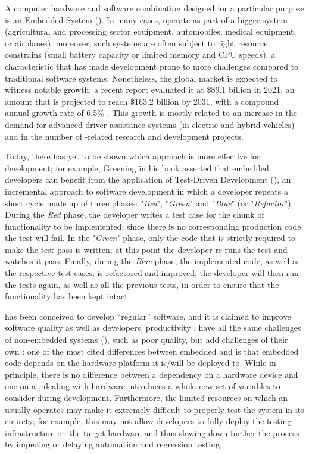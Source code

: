 \label{chap:1_introduction}
A computer hardware and software combination designed for a particular purpose is an Embedded System (\es). In many cases, \ess operate as part of a bigger system (\eg  agricultural and processing sector equipment, automobiles, medical equipment, or airplanes); moreover, such systems are often subject to tight resource constrains (\eg small battery capacity or limited memory and CPU speeds), a characteristic that has made \es development prone to more challenges compared to traditional software systems.
Nonetheless, the global \ess market is expected to witness notable growth: a recent report evaluated it at $\$$89.1 billion in 2021, an amount that is projected to reach $\$$163.2 billion by 2031, with a compound annual growth rate of 6.5\% \cite{ESSTR2022}. This growth is mostly related to an increase in the demand for advanced driver-assistance systems (in electric and hybrid vehicles) and in the number of \ess-related research and development projects.  

Today, there has yet to be shown which approach is more effective for \ess development; for example, Greening \cite{TDDEC} in his book asserted that embedded developers can benefit from the application of Test-Driven Development (\tdd), an incremental approach to software development in which a developer repeats a short cycle made up of three phases: "\textit{Red}", "\textit{Green}" and "\textit{Blue}" (or "\textit{Refactor}") \cite{TDDByExample}. 
During the \textit{Red} phase, the developer writes a test case for the chunk of functionality to be implemented; since there is no corresponding production code, the test will fail. 
In the "\textit{Green}" phase, only the code that is strictly required to make the test pass is written; at this point the developer re-runs the test and watches it pass.
Finally, during the \textit{Blue} phase, the implemented code, as well as the respective test cases, is refactored and improved; the developer will then run the tests again, as well as all the previous tests, in order to ensure that the functionality has been kept intact.

\tdd has been conceived to develop “regular” software, and it is claimed to improve software quality as well as developers' productivity \cite{DBLP:reference/se/ErdogmusMJ10}. \ess have all the same challenges of non-embedded systems (\noess), such as poor quality, but add challenges of their own \cite{TDDEC}: one of the most cited differences between embedded and \noess is that embedded code depends on the hardware platform it is/will be deployed to. 
While in principle, there is no difference between a dependency on a hardware device and one on a \noess \cite{TDDEC}, dealing with hardware introduces a whole new set of variables to consider during development. Furthermore, the limited resources on which an \es usually operates may make it extremely difficult to properly test the system in its entirety; for example, this may not allow developers to fully deploy the testing infrastructure on the target hardware and thus slowing down further the process by impeding or delaying automation and regression testing.

